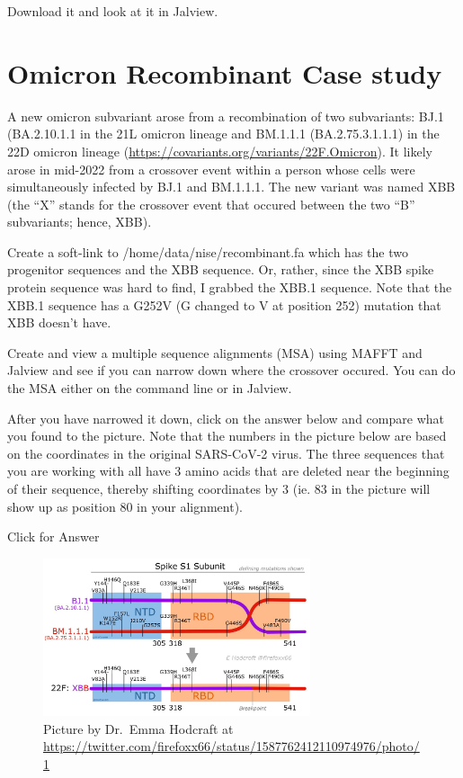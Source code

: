 \documentclass[
]{book}
\begin{document}
\hfill\break

Download it and look at it in Jalview.

\hypertarget{omicron-recombinant-case-study}{%
\section{Omicron Recombinant Case study}\label{omicron-recombinant-case-study}}

A new omicron subvariant arose from a recombination of two subvariants: BJ.1 (BA.2.10.1.1 in the 21L omicron lineage and BM.1.1.1 (BA.2.75.3.1.1.1) in the 22D omicron lineage (\url{https://covariants.org/variants/22F.Omicron}). It likely arose in mid-2022 from a crossover event within a person whose cells were simultaneously infected by BJ.1 and BM.1.1.1. The new variant was named XBB (the ``X'' stands for the crossover event that occured between the two ``B'' subvariants; hence, XBB).

Create a soft-link to /home/data/nise/recombinant.fa which has the two progenitor sequences and the XBB sequence. Or, rather, since the XBB spike protein sequence was hard to find, I grabbed the XBB.1 sequence. Note that the XBB.1 sequence has a G252V (G changed to V at position 252) mutation that XBB doesn't have.

Create and view a multiple sequence alignments (MSA) using MAFFT and Jalview and see if you can narrow down where the crossover occured. You can do the MSA either on the command line or in Jalview.

After you have narrowed it down, click on the answer below and compare what you found to the picture. Note that the numbers in the picture below are based on the coordinates in the original SARS-CoV-2 virus. The three sequences that you are working with all have 3 amino acids that are deleted near the beginning of their sequence, thereby shifting coordinates by 3 (ie. 83 in the picture will show up as position 80 in your alignment).

Click for Answer

\begin{figure}
\centering
\includegraphics[width=0.7\textwidth,height=\textheight]{./Figures/recomb.jpeg}
\caption{Picture by Dr.~Emma Hodcraft at \url{https://twitter.com/firefoxx66/status/1587762412110974976/photo/1}}
\end{figure}
\end{document}
